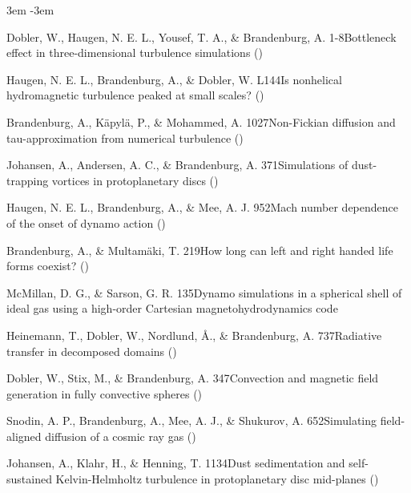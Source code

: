 \documentclass[\mydriver,12pt,twoside,notitlepage,a4paper]{article}
\begin{document}
\begin{list}{}{\leftmargin 3em \itemindent -3em\listparindent \itemindent
\itemsep 0pt \parsep 1pt}\item[]

Dobler, W., Haugen, N. E. L., Yousef, T. A., \&
Brandenburg, A.
{1-8}{Bottleneck effect in three-dimensional turbulence simulations}
()

Haugen, N. E. L., Brandenburg, A., \& Dobler, W.
{L144}{Is nonhelical hydromagnetic turbulence peaked at small scales?}
()

Brandenburg, A., K\"apyl\"a, P., \& Mohammed, A.
{1027}{Non-Fickian diffusion and tau-approximation from numerical turbulence}
()

Johansen, A., Andersen, A. C., \& Brandenburg, A.
{371}{Simulations of dust-trapping vortices in protoplanetary discs}
()

Haugen, N. E. L., Brandenburg, A., \& Mee, A. J.
{952}{Mach number dependence of the onset of dynamo action}
()

Brandenburg, A., \& Multam\"aki, T.
{219}{How long can left and right handed life forms coexist?}
()

McMillan, D. G., \& Sarson, G. R.
{135}{Dynamo simulations in a spherical shell of ideal gas using a
high-order Cartesian magnetohydrodynamics code}

Heinemann, T., Dobler, W., Nordlund, \AA., \&
Brandenburg, A.
{737}{Radiative transfer in decomposed domains}
()

Dobler, W., Stix, M., \& Brandenburg, A.
{347}{Convection and magnetic field generation in fully convective spheres}
()

Snodin, A. P., Brandenburg, A., Mee, A. J., \& Shukurov, A.
{652}{Simulating field-aligned diffusion of a cosmic ray gas}
()

Johansen, A., Klahr, H., \& Henning, T.
{1134}{Dust sedimentation and self-sustained Kelvin-Helmholtz turbulence
in protoplanetary disc mid-planes}
()


\end{list}
\end{document}
